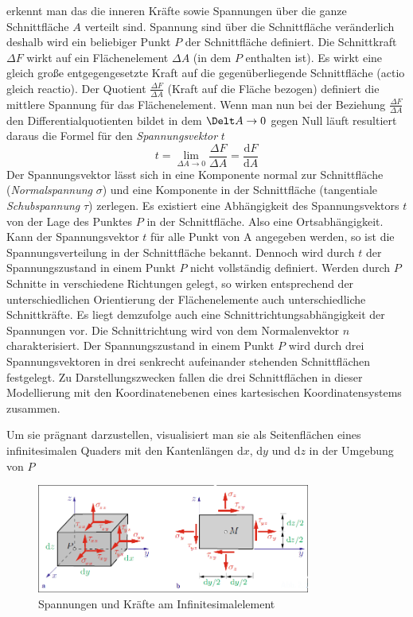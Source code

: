 \documentclass[12pt,a4paper,parskip]{scrartcl}
\begin{document}
{   erkennt man das die inneren Kräfte sowie Spannungen über die ganze Schnittfläche $ A $ verteilt sind. Spannung sind über die Schnittfläche veränderlich deshalb  wird ein beliebiger Punkt $ P $ der Schnittfläche definiert. Die Schnittkraft $ \Delta F $  wirkt auf ein Flächenelement $ \Delta A $ (in dem $ P $ enthalten ist). Es wirkt eine gleich große entgegengesetzte Kraft auf die gegenüberliegende Schnittfläche (actio gleich reactio). Der Quotient $ \frac{\Delta F}{\Delta A} $ (Kraft auf die Fläche bezogen) definiert die mittlere Spannung für das Flächenelement. Wenn man nun bei der Beziehung $ \frac{\Delta F}{\Delta A} $ den Differentialquotienten bildet in dem $ \Delt A \rightarrow 0 $ gegen Null läuft  resultiert daraus die Formel für den \emph{Spannungsvektor }$ t $ \begin{equation}
   t = \lim \limits_{\Delta A \to 0} \frac{\Delta F}{\Delta A} = \frac{\text{d}F}{\text{d}A}  
   \end{equation}
Der Spannungsvektor lässt sich in eine Komponente normal zur Schnittfläche (\emph{Normalspannung} $ \sigma $) und eine Komponente in der Schnittfläche (tangentiale \emph{Schubspannung} $ \tau $) zerlegen. Es existiert eine Abhängigkeit des Spannungsvektors $ t $ von der Lage des Punktes $ P $ in der Schnittfläche. Also eine Ortsabhängigkeit. Kann der Spannungsvektor $ t $ für alle Punkt von A angegeben werden, so ist die Spannungsverteilung in der Schnittfläche bekannt. Dennoch wird durch $ t $ der Spannungszustand in einem Punkt $ P $ nicht vollständig definiert. Werden durch $ P $ Schnitte in verschiedene Richtungen gelegt, so wirken entsprechend der unterschiedlichen Orientierung der Flächenelemente auch unterschiedliche Schnittkräfte. Es liegt demzufolge auch eine Schnittrichtungsabhängigkeit der Spannungen vor. Die Schnittrichtung wird von dem Normalenvektor $ n $ charakterisiert. Der Spannungszustand in einem Punkt $ P $ wird durch drei Spannungsvektoren in drei senkrecht aufeinander stehenden Schnittflächen festgelegt. Zu Darstellungszwecken fallen die drei Schnittflächen in dieser Modellierung mit den Koordinatenebenen eines kartesischen Koordinatensystems zusammen.

Um sie prägnant darzustellen, visualisiert man sie als Seitenflächen eines infinitesimalen Quaders mit den Kantenlängen d$ x $, d$ y $ und d$ z $ in der Umgebung von $ P $
\begin{figure}
  \centering
  \includegraphics[width=0.8\textwidth]{tensor}
  \caption[Spannungen und Kräfte am Infinitesimalelement]{Spannungen und Kräfte am Infinitesimalelement\protect\footnotemark}
  \label{fig:tensor}
  \end{figure}
  
}
\end{document}
